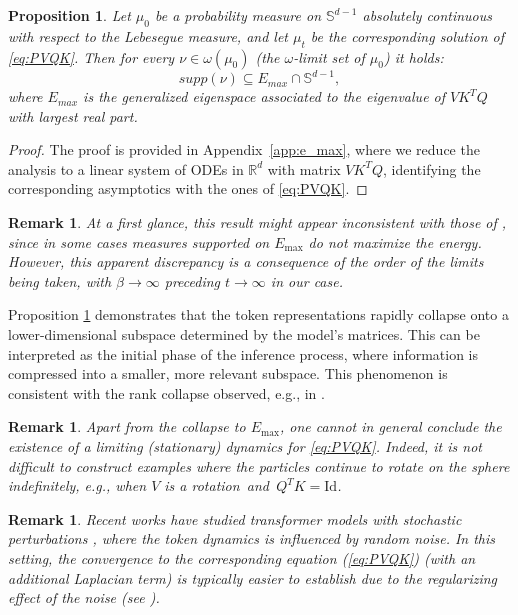 \documentclass{article}
\numberwithin{theorem}{section}
\newtheorem{proposition}[theorem]{Proposition}
\newtheorem{remark}[theorem]{Remark}
\begin{document}
\begin{proposition}
\label{prop:support_lim}
    Let $\mu_0$ be a probability measure on $\mathbb{S}^{d-1}$ absolutely continuous with respect to the Lebesegue measure, and let $\mu_t$ be the corresponding solution of \eqref{eq:PVQK}. Then for every $\nu \in \omega(\mu_0)$ (the $\omega$-limit set of $\mu_0$) it holds:
$$supp(\nu)\subseteq E_{max}\cap\mathbb{S}^{d-1},$$ 
where $E_{max}$ is the generalized eigenspace associated to the eigenvalue of $VK^TQ$ with largest real part.
\end{proposition}
\begin{proof}
The proof is provided in Appendix~\ref{app:e_max}, where we reduce the analysis to a linear system of ODEs in $\mathbb R^d$ with matrix $VK^TQ$, identifying the corresponding asymptotics with the ones of \eqref{eq:PVQK}.  
\end{proof}

\begin{remark}
At a first glance, this result might appear inconsistent with those of \cite{burger2025analysis}, since in some cases measures supported on $E_{\max}$ do not maximize the energy. However, this apparent discrepancy is a consequence of the order of the limits being taken, with $\beta \to \infty$ preceding $t \to \infty$ in our case.
\end{remark}
Proposition \ref{prop:support_lim} demonstrates that the token representations rapidly collapse onto a lower-dimensional subspace determined by the model's matrices. This can be interpreted as the initial phase of the inference process, where information is compressed into a smaller, more relevant subspace. 
This phenomenon is consistent with the rank collapse observed, e.g., in \cite{noci2022signal, giorlandino2025two}.
\begin{remark}
Apart from the collapse to $E_{\max}$, one cannot in general conclude the existence of a limiting (stationary) dynamics for \eqref{eq:PVQK}. Indeed, it is not difficult to construct examples where the particles continue to rotate on the sphere indefinitely, e.g., when $V$ is a rotation~and~$Q^TK=\mathrm{Id}$.
\end{remark}

\begin{remark}
Recent works have studied transformer models with stochastic perturbations \cite{shalova2024solutions}, where the token dynamics is influenced by random noise. In this setting, the convergence to the corresponding equation (\ref{eq:PVQK}) (with an additional Laplacian term) is typically easier to establish due to the regularizing effect of the noise (see \cite{oelschlager1985law}).
\end{remark}
\end{document}
